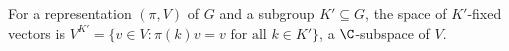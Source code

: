 For a representation $(\pi,V)$ of $G$ and a subgroup $K'\subseteq G$, the space of $K'$-fixed vectors is $V^{K'}=\{v\in V:\pi(k)v=v\text{ for all }k\in K'\}$, a $\C$-subspace of $V$.
